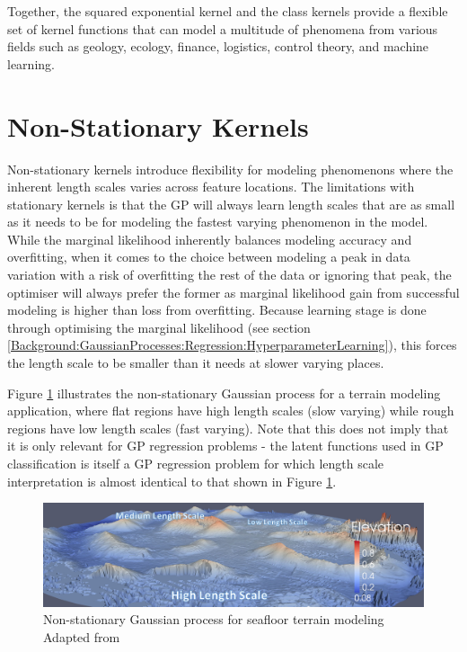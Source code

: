 				Together, the squared exponential kernel and the \matern class kernels provide a flexible set of kernel functions that can model a multitude of phenomena from various fields such as geology, ecology, finance, logistics, control theory, and machine learning.
				
	\section{Non-Stationary Kernels}
		
				Non-stationary kernels introduce flexibility for modeling phenomenons where the inherent length scales varies across feature locations. The limitations with stationary kernels is that the GP will always learn length scales that are as small as it needs to be for modeling the fastest varying phenomenon in the model. While the marginal likelihood inherently balances modeling accuracy and overfitting, when it comes to the choice between modeling a peak in data variation with a risk of overfitting the rest of the data or ignoring that peak, the optimiser will always prefer the former as marginal likelihood gain from successful modeling is higher than loss from overfitting. Because learning stage is done through optimising the marginal likelihood (see section \ref{Background:GaussianProcesses:Regression:HyperparameterLearning}), this forces the length scale to be smaller than it needs at slower varying places.

				Figure \ref{Figure:GaussianProcessLengthScale} illustrates the non-stationary Gaussian process for a terrain modeling application, where flat regions have high length scales (slow varying) while rough regions have low length scales (fast varying). Note that this does not imply that it is only relevant for GP regression problems - the latent functions used in GP classification is itself a GP regression problem for which length scale interpretation is almost identical to that shown in Figure \ref{Figure:GaussianProcessLengthScale}.
				
				\begin{figure}[!htbp]
					\centering
						\includegraphics[width=\textwidth]{Figures/gaussianprocesslengthscale.png}
					\caption{Non-stationary Gaussian process for seafloor terrain modeling Adapted from \cite{ROB:ROB21403}}
					\label{Figure:GaussianProcessLengthScale}
				\end{figure}
				

